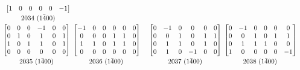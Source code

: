 \documentclass[12 pt]{article}%
\begin{document}
\begin{align*}
\begin{bmatrix}
    1 & 0 & 0 & 0 & 0 & -1 \\
  \end{bmatrix}
  \atop 2034 \,\, (1\bar400) \\
  \begin{bmatrix}
    0 & 0 & 0 & -1 & 0 & 0 \\
    0 & 1 & 0 & 1 & 0 & 1 \\
    1 & 0 & 1 & 1 & 0 & 1 \\
    0 & 0 & 0 & 0 & 0 & 0 \\
  \end{bmatrix}
  \atop 2035 \,\, (1\bar400) &
  \begin{bmatrix}
    -1 & 0 & 0 & 0 & 0 & 0 \\
    0 & 0 & 0 & 1 & 1 & 0 \\
    1 & 1 & 0 & 1 & 1 & 0 \\
    0 & 0 & 0 & 0 & 0 & 0 \\
  \end{bmatrix}
  \atop 2036 \,\, (1\bar400) &
  \begin{bmatrix}
    0 & -1 & 0 & 0 & 0 & 0 \\
    0 & 0 & 1 & 0 & 1 & 1 \\
    0 & 1 & 1 & 0 & 1 & 0 \\
    0 & 1 & 0 & -1 & 0 & 0 \\
  \end{bmatrix}
  \atop 2037 \,\, (1\bar400) &
  \begin{bmatrix}
    0 & -1 & 0 & 0 & 0 & 0 \\
    0 & 0 & 1 & 0 & 1 & 1 \\
    0 & 1 & 1 & 1 & 0 & 0 \\
    1 & 0 & 0 & 0 & 0 & -1 \\
  \end{bmatrix}
  \atop 2038 \,\, (1\bar400) \\
\end{align*}
\end{document}

